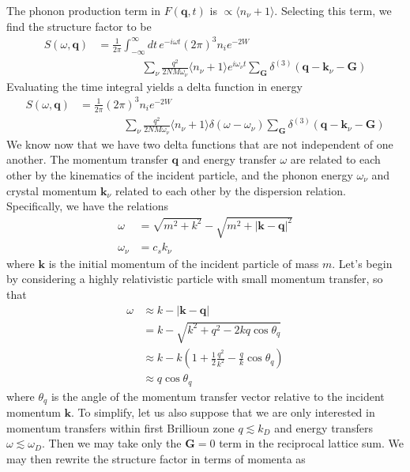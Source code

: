 \documentclass{article}
\begin{document}
The phonon production term in $F(\textbf{q}, t)$ is $ \propto \langle n_\nu + 1 \rangle$. Selecting this term, we find the structure factor to be
\begin{align}
S(\omega, \textbf{q}) &= \frac{1}{2 \pi} \int_{-\infty}^\infty dt \, e^{-i \omega t} (2 \pi)^3 n_i e^{-2 W}  \nonumber\\
 &\qquad\qquad  \sum_\nu\frac{q^2}{2 NM \omega_\nu} \langle n_\nu + 1 \rangle e^{i \omega_\nu t} \sum_\textbf{G} \delta^{(3)}(\textbf{q} - \textbf{k}_\nu - \textbf{G})
\end{align}
Evaluating the time integral yields a delta function in energy
\begin{align}
S(\omega, \textbf{q}) &= \frac{1}{2 \pi} (2 \pi)^3 n_i e^{-2 W}  \nonumber\\
&\qquad\qquad  \sum_\nu\frac{q^2}{2 NM \omega_\nu} \langle n_\nu + 1 \rangle \delta(\omega - \omega_\nu) \sum_\textbf{G} \delta^{(3)}(\textbf{q} - \textbf{k}_\nu - \textbf{G})
\label{eq:1PhononStructureFactor}
\end{align}
We know now that we have two delta functions that are not independent of one another. The momentum transfer $\textbf{q}$ and energy transfer $\omega$ are related to each other by the kinematics of the incident particle, and the phonon energy $\omega_\nu$ and crystal momentum $\textbf{k}_\nu$ related to each other by the dispersion relation. Specifically, we have the relations
\begin{align}
\omega &= \sqrt{m^2 + k^2} - \sqrt{m^2 + |\textbf{k} - \textbf{q}|^2} \label{eq:EnergyTransfer} \\
\omega_\nu &= c_sk_\nu \label{eq:DispersionRelation}
\end{align}
where $\textbf{k}$ is the initial momentum of the incident particle of mass $m$. Let's begin by considering a highly relativistic particle with small momentum transfer, so that
\begin{align}
\omega &\approx k - |\textbf{k} - \textbf{q}| \\
   &= k - \sqrt{k^2 + q^2 - 2 kq\cos\theta_{q}} \\
   &\approx k - k \left( 1 + \frac12 \frac{q^2}{k^2} - \frac{q}{k}\cos\theta_{q} \right) \\
   &\approx q\cos\theta_{q} \label{eq:EnergyMomentumRelation}
\end{align}
where $\theta_q$ is the angle of the momentum transfer vector relative to the incident momentum $\textbf{k}$.
To simplify, let us also suppose that we are only interested in momentum transfers within first Brillioun zone $q\lesssim k_D$ and energy transfers $\omega \lesssim \omega_D$. Then we may take only the $\textbf{G} = 0$ term in the reciprocal lattice sum. We may then rewrite the structure factor in terms of momenta as
\end{document}
